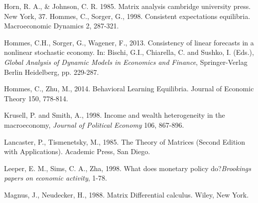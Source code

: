 \begin{thebibliography}{}
\bibitem{} Horn, R. A., \& Johnson, C. R. 1985. Matrix analysis cambridge university press. New York, 37.
%
%
%
 Hommes, C., Sorger, G., 1998. Consistent expectations
equilibria. Macroeconomic Dynamics 2, 287-321.
%

 Hommes, C.H., Sorger, G., Wagener, F., 2013.
Consistency of linear forecasts in a nonlinear stochastic economy.
In: Bischi, G.I., Chiarella, C. and Sushko, I. (Eds.), {\it Global
Analysis of Dynamic Models in Economics and Finance},
Springer-Verlag Berlin Heidelberg, pp. 229-287.

 Hommes, C., Zhu, M., 2014. Behavioral Learning Equilibria. Journal of Economic Theory 150, 778-814.

 Krusell, P. and Smith, A., 1998. Income and wealth heterogeneity in the macroeconomy, {\it Journal of Political Economy} 106, 867-896.

%
%

\bibitem{} Lancaster, P., Tismenetsky, M., 1985. The Theory of Matrices (Second Edition with Applications). Academic Press, San Diego.


\bibitem{} Leeper, E. M., Sims, C. A., Zha, 1998. What does monetary policy do?{\it Brookings papers on economic activity}, 1-78.

%
\bibitem{} Magnus, J., Neudecker, H., 1988. Matrix Differential calculus. Wiley, New York.


\end{thebibliography}
